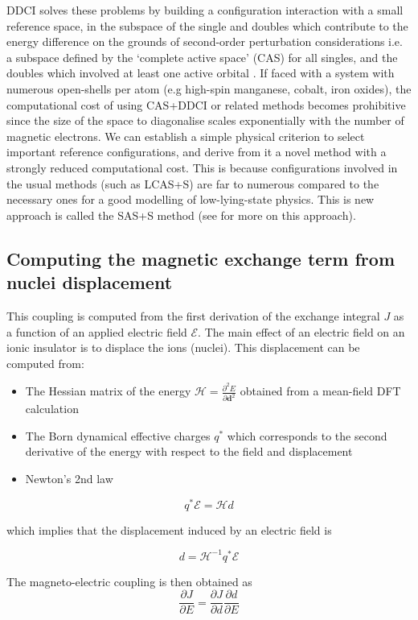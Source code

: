 \documentclass[10pt]{article}
\begin{document}
DDCI solves these problems by building a configuration interaction with a small reference space, in the subspace of the single and doubles which contribute to the energy difference on the grounds of second-order perturbation considerations i.e. a subspace defined by the `complete active space' (CAS) for all singles, and the doubles which involved at least one active orbital \cite{garcia1997application}. If faced with a system with numerous open-shells per atom (e.g high-spin manganese, cobalt, iron oxides), the computational cost of using CAS+DDCI or related methods becomes prohibitive since the size of the space to diagonalise scales exponentially with the number of magnetic electrons. We can establish a simple physical criterion to select important reference configurations, and derive from it a novel method with a strongly reduced computational cost. This is because configurations involved in the usual methods (such as LCAS+S) are far to numerous compared to the necessary ones for a good modelling of low-lying-state physics. This is new approach is called the SAS+S method (see \cite{gelle2009accurate} for more on this approach).

\subsection{Computing the magnetic exchange term from nuclei displacement}

This coupling is computed from the first derivation of the exchange integral $J$
as a function of an applied electric field $\mathcal{E}$. The main effect of an electric field on an ionic insulator is to displace the
ions (nuclei). This displacement can be computed from:
\begin{itemize}
\item The Hessian matrix of the
energy $\mathcal{H} = \frac{\partial^2 E}{\partial \mathbf{d} ^2} $ obtained
from a mean-field DFT calculation
\item The Born dynamical effective charges $q^*$ which corresponds to the second
  derivative of the energy with respect to the field and displacement
\item Newton's 2nd law
\end{itemize}

$$ q^* \mathcal{E} = \mathcal{H} d $$

which implies that the displacement induced by an electric field is

$$ d = \mathcal{H}^{-1} q^* \mathcal{E} $$

The magneto-electric coupling is then obtained as
  $$ \dfrac{\partial J}{\partial E} = \dfrac{\partial J}{\partial
    d}\dfrac{\partial d}{\partial E} $$
\end{document}
